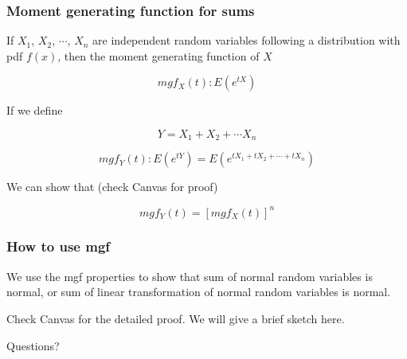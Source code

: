 \documentclass{beamer}\usepackage[]{graphicx}\usepackage[]{color}
\begin{document}
\begin{frame}[fragile]

\frametitle{Moment generating function for sums}

If $X_1$, $X_2$, $\cdots$, $X_{n}$ are independent random variables following a distribution with pdf $f(x)$, then the moment generating function of $X$

$$ mgf_{X}(t) : E(e^{tX})  $$

If we define 

$$ Y = X_1 + X_2 + \cdots X_n $$

$$ mgf_{Y}(t):  E(e^{tY}) = E(e^{tX_1 + tX_2 + \cdots + tX_n}) $$

We can show that  (check Canvas for proof)

$$ mgf_{Y}(t) = \left [ mgf_{X}(t) \right ]^{n} $$

\end{frame}

\begin{frame}[fragile]


\frametitle{How to use mgf}

We use the mgf properties to show that sum of normal random variables is normal, or sum of linear transformation of normal random variables is normal. \pause \newline

Check Canvas for the detailed proof. We will give a brief sketch here. \pause \newline

Questions?  \pause \newline

\end{frame}
\end{document}
